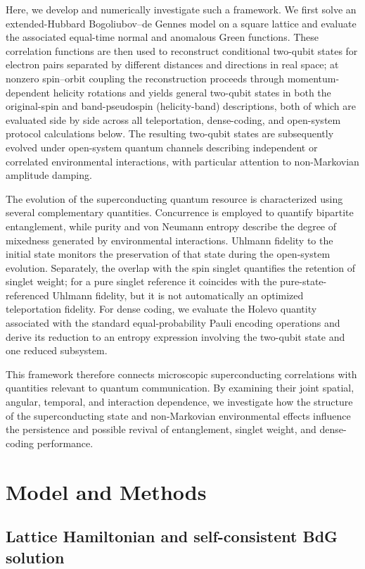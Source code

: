 \documentclass[aps,prb,twocolumn,superscriptaddress,longbibliography]{revtex4-2}
\begin{document}
Here, we develop and numerically investigate such a framework. We first solve an extended-Hubbard Bogoliubov--de Gennes model on a square lattice and evaluate the associated equal-time normal and anomalous Green functions. These correlation functions are then used to reconstruct conditional
two-qubit states for electron pairs separated by different distances and
directions in real space; at nonzero spin--orbit coupling the
reconstruction proceeds through momentum-dependent helicity rotations and
yields general two-qubit states in both the original-spin and
band-pseudospin (helicity-band) descriptions, both of which are evaluated
side by side across all teleportation, dense-coding, and open-system
protocol calculations below. The resulting two-qubit states are subsequently evolved under open-system quantum channels describing independent or correlated environmental interactions, with particular attention to non-Markovian amplitude damping.

The evolution of the superconducting quantum resource is characterized using several complementary quantities. Concurrence is employed to quantify bipartite entanglement, while purity and von Neumann entropy describe the degree of mixedness generated by environmental interactions. Uhlmann fidelity to the initial state monitors the preservation of that state during the open-system evolution. Separately, the overlap with the spin singlet quantifies the retention of singlet weight; for a pure singlet reference it coincides with the pure-state-referenced Uhlmann fidelity, but it is not automatically an optimized teleportation fidelity. For dense coding, we evaluate the Holevo quantity associated with the standard equal-probability Pauli encoding operations and derive its reduction to an entropy expression involving the two-qubit state and one reduced subsystem.

This framework therefore connects microscopic superconducting correlations with quantities relevant to quantum communication. By examining their joint spatial, angular, temporal, and interaction dependence, we investigate how the structure of the superconducting state and non-Markovian environmental effects influence the persistence and possible revival of entanglement, singlet weight, and dense-coding performance.


\section{Model and Methods}

\subsection{Lattice Hamiltonian and self-consistent BdG solution}
\end{document}
